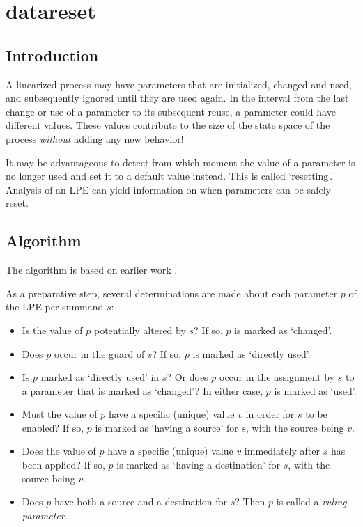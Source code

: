 \chapter{datareset}

\section{Introduction}

A linearized process may have parameters that are initialized, changed and used, and subsequently ignored until they are used again.
In the interval from the last change or use of a parameter to its subsequent reuse, a parameter could have different values.
These values contribute to the size of the state space of the process \emph{without} adding any new behavior!

It may be advantageous to detect from which moment the value of a parameter is no longer used and set it to a default value instead.
This is called `resetting'.
Analysis of an LPE can yield information on when parameters can be safely reset.

\section{Algorithm}

The algorithm is based on earlier work \cite{van2009state}.

As a preparative step, several determinations are made about each parameter $p$ of the LPE per summand $s$:
\begin{itemize}

\item Is the value of $p$ potentially altered by $s$?
If so, $p$ is marked as `changed'.

\item Does $p$ occur in the guard of $s$?
If so, $p$ is marked as `directly used'.

\item Is $p$ marked as `directly used' in $s$?
Or does $p$ occur in the assignment by $s$ to a parameter that is marked as `changed'?
In either case, $p$ is marked as `used'.

\item Must the value of $p$ have a specific (unique) value $v$ in order for $s$ to be enabled?
If so, $p$ is marked as `having a source' for $s$, with the source being $v$.

\item Does the value of $p$ have a specific (unique) value $v$ immediately after $s$ has been applied?
If so, $p$ is marked as `having a destination' for $s$, with the source being $v$.

\item Does $p$ have both a source and a destination for $s$?
Then $p$ is called a \emph{ruling parameter}.

\end{itemize}

